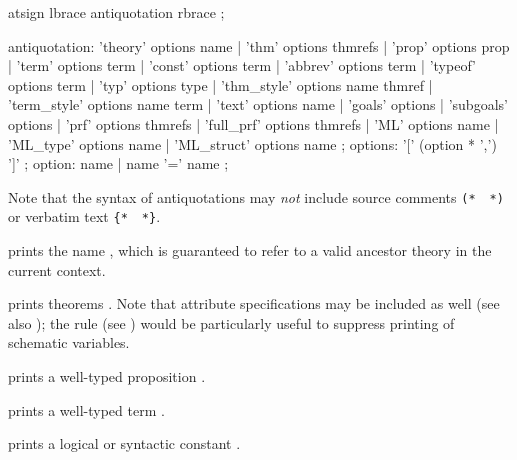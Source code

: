\begin{isabellebody}
\begin{isamarkuptext}
  \begin{rail}
    atsign lbrace antiquotation rbrace
    ;

    antiquotation:
      'theory' options name |
      'thm' options thmrefs |
      'prop' options prop |
      'term' options term |
      'const' options term |
      'abbrev' options term |
      'typeof' options term |
      'typ' options type |
      'thm\_style' options name thmref |
      'term\_style' options name term |
      'text' options name |
      'goals' options |
      'subgoals' options |
      'prf' options thmrefs |
      'full\_prf' options thmrefs |
      'ML' options name |
      'ML\_type' options name |
      'ML\_struct' options name
    ;
    options: '[' (option * ',') ']'
    ;
    option: name | name '=' name
    ;
  \end{rail}

  Note that the syntax of antiquotations may \emph{not} include source
  comments \verb|(*|~\isa{{\isasymdots}}~\verb|*)| or verbatim
  text \verb|{|\verb|*|~\isa{{\isasymdots}}~\verb|*|\verb|}|.

  \begin{descr}
  
  \item [\isa{{\isacharat}{\isacharbraceleft}theory\ A{\isacharbraceright}}] prints the name , which is
  guaranteed to refer to a valid ancestor theory in the current
  context.

  \item [\isa{{\isacharat}{\isacharbraceleft}thm\ a\isactrlsub {\isadigit{1}}\ {\isasymdots}\ a\isactrlsub n{\isacharbraceright}}] prints theorems
  .  Note that attribute specifications
  may be included as well (see also ); the
  \mbox{} rule (see ) would
  be particularly useful to suppress printing of schematic variables.

  \item [\isa{{\isacharat}{\isacharbraceleft}prop\ {\isasymphi}{\isacharbraceright}}] prints a well-typed proposition \isa{{\isasymphi}}.

  \item [\isa{{\isacharat}{\isacharbraceleft}term\ t{\isacharbraceright}}] prints a well-typed term .

  \item [\isa{{\isacharat}{\isacharbraceleft}const\ c{\isacharbraceright}}] prints a logical or syntactic constant
  .
  

\end{descr}
\end{isamarkuptext}
\end{isabellebody}
